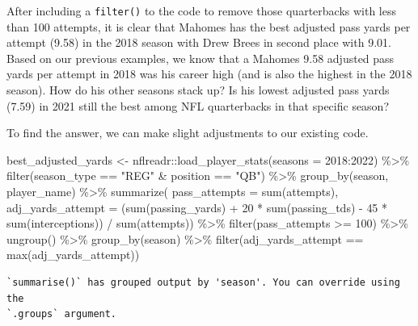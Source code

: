 \documentclass[
  letterpaper,
]{krantz}
\newenvironment{Shaded}{\begin{snugshade}}{\end{snugshade}}
\newcommand{\AttributeTok}[1]{\textcolor[rgb]{0.40,0.45,0.13}{#1}}
\newcommand{\DecValTok}[1]{\textcolor[rgb]{0.68,0.00,0.00}{#1}}
\newcommand{\FunctionTok}[1]{\textcolor[rgb]{0.28,0.35,0.67}{#1}}
\newcommand{\NormalTok}[1]{\textcolor[rgb]{0.00,0.23,0.31}{#1}}
\newcommand{\OtherTok}[1]{\textcolor[rgb]{0.00,0.23,0.31}{#1}}
\newcommand{\SpecialCharTok}[1]{\textcolor[rgb]{0.37,0.37,0.37}{#1}}
\newcommand{\StringTok}[1]{\textcolor[rgb]{0.13,0.47,0.30}{#1}}
\begin{document}
After including a \texttt{filter()} to the code to remove those
quarterbacks with less than 100 attempts, it is clear that Mahomes has
the best adjusted pass yards per attempt (9.58) in the 2018 season with
Drew Brees in second place with 9.01. Based on our previous examples, we
know that a Mahomes 9.58 adjusted pass yards per attempt in 2018 was his
career high (and is also the highest in the 2018 season). How do his
other seasons stack up? Is his lowest adjusted pass yards (7.59) in 2021
still the best among NFL quarterbacks in that specific season?

To find the answer, we can make slight adjustments to our existing code.

\begin{Shaded}
\begin{Highlighting}[]
\NormalTok{best\_adjusted\_yards }\OtherTok{\textless{}{-}}
\NormalTok{  nflreadr}\SpecialCharTok{::}\FunctionTok{load\_player\_stats}\NormalTok{(}\AttributeTok{seasons =} \DecValTok{2018}\SpecialCharTok{:}\DecValTok{2022}\NormalTok{) }\SpecialCharTok{\%\textgreater{}\%}
  \FunctionTok{filter}\NormalTok{(season\_type }\SpecialCharTok{==} \StringTok{"REG"} \SpecialCharTok{\&}\NormalTok{ position }\SpecialCharTok{==} \StringTok{"QB"}\NormalTok{) }\SpecialCharTok{\%\textgreater{}\%}
  \FunctionTok{group\_by}\NormalTok{(season, player\_name) }\SpecialCharTok{\%\textgreater{}\%}
  \FunctionTok{summarize}\NormalTok{(}
    \AttributeTok{pass\_attempts =} \FunctionTok{sum}\NormalTok{(attempts),}
    \AttributeTok{adj\_yards\_attempt =}\NormalTok{ (}\FunctionTok{sum}\NormalTok{(passing\_yards) }\SpecialCharTok{+} \DecValTok{20} \SpecialCharTok{*}
                           \FunctionTok{sum}\NormalTok{(passing\_tds) }\SpecialCharTok{{-}} \DecValTok{45} \SpecialCharTok{*}
                           \FunctionTok{sum}\NormalTok{(interceptions)) }\SpecialCharTok{/} \FunctionTok{sum}\NormalTok{(attempts)) }\SpecialCharTok{\%\textgreater{}\%}
  \FunctionTok{filter}\NormalTok{(pass\_attempts }\SpecialCharTok{\textgreater{}=} \DecValTok{100}\NormalTok{) }\SpecialCharTok{\%\textgreater{}\%}
  \FunctionTok{ungroup}\NormalTok{() }\SpecialCharTok{\%\textgreater{}\%}
  \FunctionTok{group\_by}\NormalTok{(season) }\SpecialCharTok{\%\textgreater{}\%}
  \FunctionTok{filter}\NormalTok{(adj\_yards\_attempt }\SpecialCharTok{==} \FunctionTok{max}\NormalTok{(adj\_yards\_attempt))}
\end{Highlighting}
\end{Shaded}

\begin{verbatim}
`summarise()` has grouped output by 'season'. You can override using the
`.groups` argument.
\end{verbatim}
\end{document}
